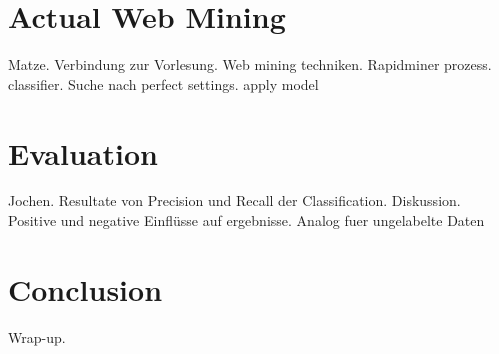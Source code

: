 \documentclass[11pt,titlepage,oneside,openany]{book}
\begin{document}
\section{Actual Web Mining}
Matze. Verbindung zur Vorlesung. Web mining techniken. Rapidminer prozess. classifier. Suche nach perfect settings. apply model 

\section{Evaluation}
Jochen. Resultate von Precision und Recall der Classification. Diskussion. Positive und negative Einflüsse auf ergebnisse. Analog fuer ungelabelte Daten 
\section{Conclusion}
Wrap-up.



\end{document}
